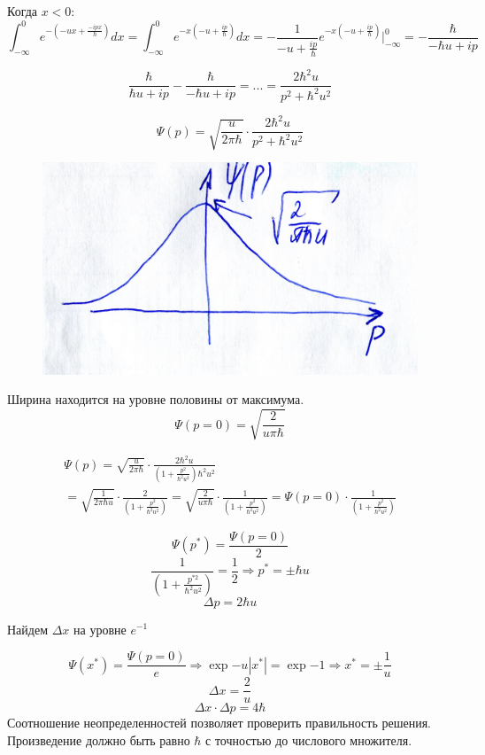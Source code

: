 Когда $x<0$:
$$\int_{-\infty}^{0} e^{-(-ux+\frac{-ipx}{\hbar})}dx=\int_{-\infty}^{0} e^{-x(-u+\frac{ip}{\hbar})}dx=-\frac{1}{-u+\frac{ip}{\hbar}}e^{-x(-u+\frac{ip}{\hbar})} \bigg|_{-\infty}^0=-\frac{\hbar}{-\hbar u+ip}$$

$$\frac{\hbar}{\hbar u+ip}-\frac{\hbar}{-\hbar u+ip}=...=\frac{2\hbar ^2u}{p^2+\hbar ^2u^2}$$


$$\Psi(p)=\sqrt{\frac{u}{2\pi \hbar}} \cdot \frac{2\hbar ^2u}{p^2+\hbar ^2u^2}$$

\begin{figure}
\includegraphics[width=\linewidth]{fig/fig731}
\caption{}
\vspace{-17pt}
\end{figure}

 Ширина находится на уровне половины от максимума.
 $$\Psi(p=0)=\sqrt{\frac{2}{u\pi \hbar}}$$

 \begin{gather*}
 \Psi(p)=\sqrt{\frac{u}{2\pi \hbar}} \cdot
 \frac{2\hbar ^2u}{(1+\frac{p^2}{\hbar ^2u^2})\hbar ^2u^2}\\
 =\sqrt{\frac{1}{2\pi \hbar u}} \cdot \frac{2}{(1+\frac{p^2}{\hbar ^2u^2})}=\sqrt{\frac{2}{u\pi \hbar}} \cdot \frac{1}{(1+\frac{p^2}{\hbar ^2u^2})}=\Psi(p=0)\cdot \frac{1}{(1+\frac{p^2}{\hbar ^2u^2})} 
 \end{gather*}

 $$\Psi(p^*)=\frac{\Psi(p=0)}{2}$$
 $$\frac{1}{(1+\frac{p^{*2}}{\hbar ^2u^2})}=\frac12 \Longrightarrow p^*=\pm \hbar u $$ 
 $$\Delta p=2\hbar u$$

Найдем $\Delta x$ на уровне $e^{-1}$

$$\Psi(x^*)=\frac{\Psi(p=0)}{e} \Longrightarrow \exp{-u|x^*|}=\exp{-1} \Longrightarrow x^*=\pm \frac{1}{u}$$
 $$\Delta x=\frac{2}{u}$$
 $$\Delta x \cdot \Delta p= 4\hbar$$
 Соотношение неопределенностей позволяет проверить правильность решения. Произведение должно быть равно $\hbar$ с точностью до числового множителя.
